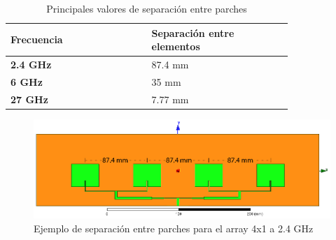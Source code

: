 \begin{table}[H]
   
   \label{tab:sepparches}
   \small %
   \centering %
   \begin{tabular}{m{0.4\linewidth}m{0.4\linewidth}} %
   \toprule[\heavyrulewidth]\toprule[\heavyrulewidth]
   \textbf{Frecuencia} & \textbf{Separación entre elementos}  \\ 
   \midrule
   \textbf{2.4 GHz} & 87.4 mm  \\
   \textbf{6 GHz} & 35 mm  \\
   \textbf{27 GHz} & 7.77 mm  \\
   \bottomrule[\heavyrulewidth] 
   \end{tabular}
   \caption{Principales valores de separación entre parches} 
   \label{tab:sepparches}
\end{table}

\begin{figure}[h]
    \centering
        \includegraphics[width=\textwidth]{archivos/array/separacionparches}
        \caption{Ejemplo de separación entre parches para el array 4x1 a 2.4 GHz}
        \label{fig:ejemploseparación}
\end{figure}

